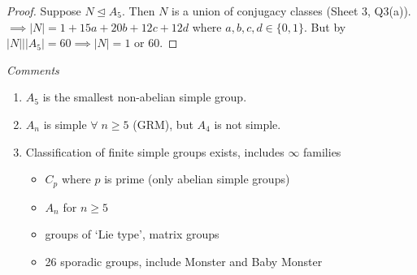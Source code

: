 \begin{proof}
    Suppose $N \trianglelefteq A_5$.
    Then $N$ is a union of conjugacy classes (Sheet 3, Q3(a)). \\
    $\implies |N| = 1 + 15a + 20b + 12c + 12d$ where $a, b, c, d \in \{0, 1\}$.
    But by  $|N| \mathbin{\bigg|} |A_5| = 60 \implies |N| = 1 \text{ or } 60$.
\end{proof} 

\emph{Comments}

\begin{enumerate}
    \item $A_5$ is the smallest non-abelian simple group.
    \item $A_n$ is simple $\forall \; n \geq 5$ (GRM), but $A_4$ is not simple.
    \item Classification of finite simple groups exists, includes $\infty$ families
    \begin{itemize}
        \item $C_p$ where $p$ is prime (only abelian simple groups) 
        \item $A_n$ for $n \geq 5$
        \item groups of `Lie type', matrix groups
        \item 26 sporadic groups, include Monster and Baby Monster
    \end{itemize} 
\end{enumerate} 